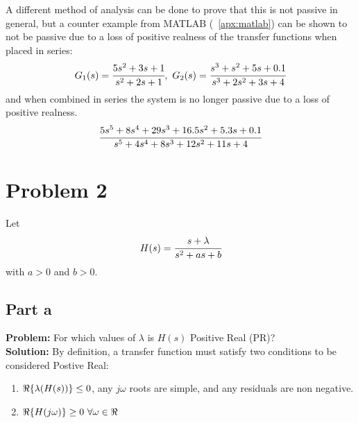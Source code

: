 \documentclass[letter]{article}
\begin{document}
A different method of analysis can be done to prove that this is not passive in general, but a counter example from MATLAB (\appendixname \ \ref{apx:matlab}) can be shown to not be passive due to a loss of positive realness of the transfer functions when placed in series:
$$G_1(s) = \cfrac{5s^2 + 3s + 1}{s^2 + 2s + 1}, \ G_2(s) = \cfrac{s^3 + s^2 + 5s + 0.1}{s^3 + 2s^2 + 3s + 4}$$
and when combined in series the system is no longer passive due to a loss of positive realness.
$$ \cfrac{5 s^5 + 8 s^4 + 29 s^3 + 16.5 s^2 + 5.3 s + 0.1}{s^5 + 4 s^4 + 8 s^3 + 12 s^2 + 11 s + 4}$$


\newpage
\section{Problem 2}
Let $$H(s) = \cfrac{s+\lambda}{s^2 + a s + b}$$ with $a>0$ and $b>0$.

\subsection{Part a}
\textbf{Problem:}
For which values of $\lambda$ is $H(s)$ Positive Real (PR)?\\

\noindent
\textbf{Solution:}
By definition, a transfer function must satisfy two conditions to be considered Postive Real:
\begin{enumerate}
	\item $\real\{\lambda(H(s))\} \leq 0$, any $j\omega$ roots are simple, and any residuals are non negative.
	\item $\real\{H(j\omega)\} \geq 0 \ \forall \omega \in \real$
\end{enumerate}
\end{document}
